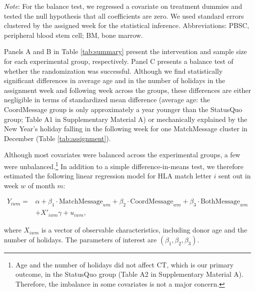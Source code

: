 \documentclass[12pt, a4paper]{article}
\begin{document}
\begin{table}
\begin{threeparttable}
\begin{tabular}[t]{lccccc}
\bottomrule
\end{tabular}
\begin{tablenotes}
\item \emph{Note}: For the balance test, we regressed a covariate on treatment dummies and tested the null hypothesis that all coefficients are zero. We used standard errors clustered by the assigned week for the statistical inference. Abbreviations: PBSC, peripheral blood stem cell; BM, bone marrow.
\end{tablenotes}
\end{threeparttable}
\end{table}

Panels A and B in Table \ref{tab:summary} present the intervention and sample size for each experimental group, respectively. Panel C presents a balance test of whether the randomization was successful. Although we find statistically significant differences in average age and in the number of holidays in the assignment week and following week across the groups, these differences are either negligible in terms of standardized mean difference (average age: the CoordMessage group is only approximately a year younger than the StatusQuo group; Table A1 in Supplementary Material A) or mechanically explained by the New Year's holiday falling in the following week for one MatchMessage cluster in December (Table \ref{tab:assignment}).

Although most covariates were balanced across the experimental groups, a few were unbalanced.\footnote{Age and the number of holidays did not affect CT, which is our primary outcome, in the StatusQuo group (Table A2 in Supplementary Material A). Therefore, the imbalance in some covariates is not a major concern.} In addition to a simple difference-in-means test, we therefore estimated the following linear regression model for HLA match letter \(i\) sent out in week \(w\) of month \(m\):

\begin{equation}
  \begin{split}
  Y_{iwm} =& \alpha + \beta_1 \cdot \text{MatchMessage}_{wm}
  + \beta_2 \cdot \text{CoordMessage}_{wm} + \beta_3 \cdot \text{BothMessage}_{wm} \\
  &+ X'_{iwm} \gamma + u_{iwm},
  \end{split}\label{eq:reg}
\end{equation}

\noindent
where \(X_{iwm}\) is a vector of observable characteristics, including donor age and the number of holidays. The parameters of interest are \((\beta_1, \beta_2, \beta_3)\).
\end{document}
